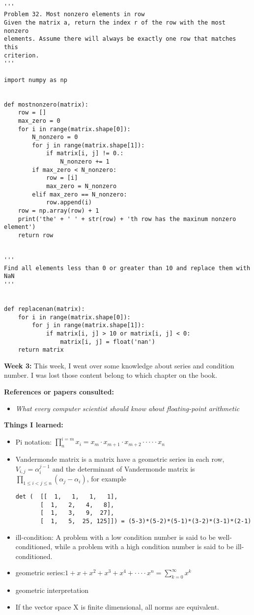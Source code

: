 \documentclass{article}
\begin{document}
\begin{verbatim}

'''
Problem 32. Most nonzero elements in row
Given the matrix a, return the index r of the row with the most nonzero
elements. Assume there will always be exactly one row that matches this
criterion.
'''

import numpy as np


def mostnonzero(matrix):
    row = []
    max_zero = 0
    for i in range(matrix.shape[0]):
        N_nonzero = 0
        for j in range(matrix.shape[1]):
            if matrix[i, j] != 0.:
                N_nonzero += 1
        if max_zero < N_nonzero:
            row = [i]
            max_zero = N_nonzero
        elif max_zero == N_nonzero:
            row.append(i)
    row = np.array(row) + 1
    print('the' + ' ' + str(row) + 'th row has the maxinum nonzero element')
    return row


'''
Find all elements less than 0 or greater than 10 and replace them with NaN
'''


def replacenan(matrix):
    for i in range(matrix.shape[0]):
        for j in range(matrix.shape[1]):
            if matrix[i, j] > 10 or matrix[i, j] < 0:
                matrix[i, j] = float('nan')
    return matrix
\end{verbatim} 



\newpage
\textbf{Week 3:}
This week, I went over some knowledge about series and condition number. I was lost those content belong to which chapter on the book.

\textbf{References or papers consulted:}
\begin{itemize}

\item {\em What every computer scientist should know about floating-point arithmetic}

\end{itemize}

\textbf{Things I learned:}
\begin{itemize}
\item Pi notation: $\prod_n^{i=m} x_i = x_m \cdot x_{m+1} \cdot x_{m+2} \cdot\cdot\cdot\cdot\cdot x_n $
\item Vandermonde matrix is a matrix have a geometric series in each row, $V_{i,j} = \alpha_i^{j-1}$ and the determinant of Vandermonde matrix is $\prod_{1\leq i <j \leq n }(\alpha_j - \alpha_i) $, for example
\begin{verbatim}
det (  [[  1,   1,   1,   1],
       [  1,   2,   4,   8],
       [  1,   3,   9,  27],
       [  1,   5,  25, 125]]) = (5-3)*(5-2)*(5-1)*(3-2)*(3-1)*(2-1)
\end{verbatim}
\item ill-condition: A problem with a low condition number is said to be well-conditioned, while a problem with a high condition number is said to be ill-conditioned.
\item geometric series:$1+x+x^2+x^3+x^4 + \cdot\cdot\cdot\cdot x^n = \sum^\infty_{k=0} x^k  $
\item geometric interpretation
\item If the vector space X is finite dimensional, all norms are equivalent.
\end{itemize}
\end{document}
